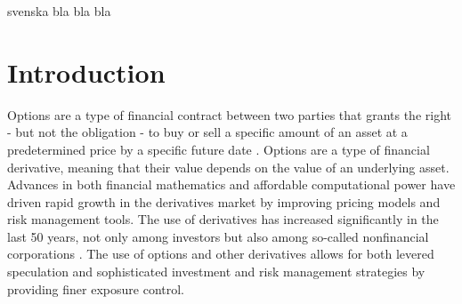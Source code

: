 \documentclass[english,12pt,a4paper,pdftex,sci,utf8]{aaltothesis}
\begin{document}
\newpage
%

\newpage
%
%
\begin{abstractpage}[swedish]
 svenska bla bla bla
\end{abstractpage}

\newpage



\thesistableofcontents




\cleardoublepage
\storeinipagenumber
{}
\setcounter{page}{1}


\section{Introduction}

\thispagestyle{empty}
Options are a type of financial contract between two parties that grants the right - but not the obligation - to buy or sell a specific amount of an asset at a predetermined price by a specific future date \cite[p. 6]{hull2016options}. Options are a type of financial derivative, meaning that their value depends on the value of an underlying asset. Advances in both financial mathematics \cite{merton1994influence} and affordable computational power \cite{nordhaus2007two} have driven rapid growth in the derivatives market by improving pricing models and risk management tools. The use of derivatives has increased significantly in the last 50 years, not only among investors but also among so-called nonfinancial corporations \cite{bartram2009international}. The use of options and other derivatives allows for both levered speculation and sophisticated investment and risk management strategies by providing finer exposure control.
\end{document}
